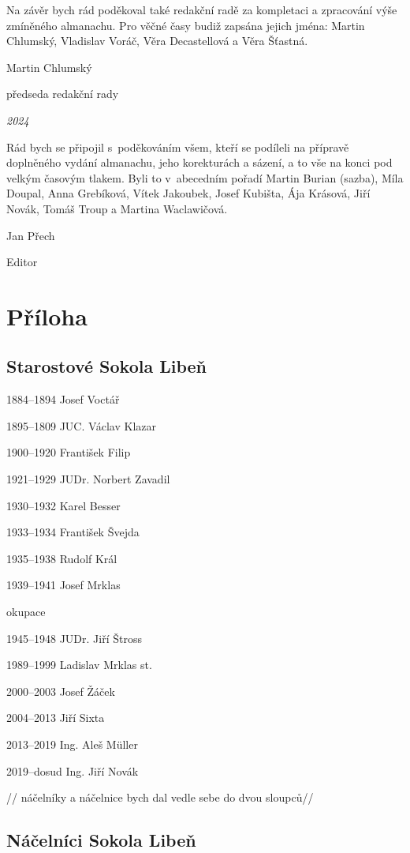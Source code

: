 \documentclass[a5paper, 12pt, twoside]{article}
\begin{document}
Na závěr bych rád poděkoval také redakční radě za kompletaci a
zpracování výše zmíněného almanachu. Pro věčné časy budiž zapsána jejich
jména: Martin Chlumský, Vladislav Voráč, Věra Decastellová a Věra
Šťastná.

Martin Chlumský

předseda redakční rady

\textit{2024}

Rád bych se připojil s~poděkováním všem, kteří se podíleli na přípravě
doplněného vydání almanachu, jeho korekturách a sázení, a to vše na
konci pod velkým časovým tlakem. Byli to v~abecedním pořadí Martin
Burian (sazba), Míla Doupal, Anna Grebíková, Vítek Jakoubek, Josef
Kubišta, Ája Krásová, Jiří Novák, Tomáš Troup a Martina Waclawičová.

Jan Přech

Editor

\section{Příloha}

\subsection{Starostové Sokola Libeň }

1884--1894 Josef Voctář

1895--1809 JUC. Václav Klazar

1900--1920 František Filip

1921--1929 JUDr. Norbert Zavadil

1930--1932 Karel Besser

1933--1934 František Švejda

1935--1938 Rudolf Král

1939--1941 Josef Mrklas

okupace

1945--1948 JUDr. Jiří Štross

1989--1999 Ladislav Mrklas st.

2000--2003 Josef Žáček

2004--2013 Jiří Sixta

2013--2019 Ing. Aleš Müller

2019--dosud Ing. Jiří Novák

// náčelníky a náčelnice bych dal vedle sebe do dvou sloupců//

\subsection{Náčelníci Sokola
Libeň}
\end{document}
